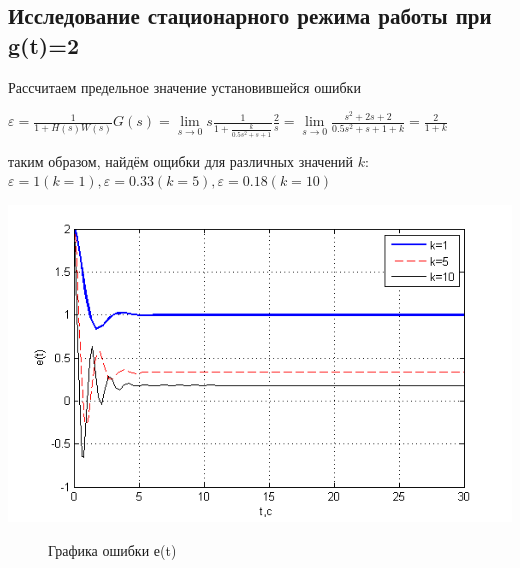 \documentclass[a4paper, 11pt]{article}
\begin{document}
\subsection{Исследование стационарного режима работы при g(t)=2}
Рассчитаем предельное значение установившейся ошибки
\vspace{0.5cm}

$\varepsilon  = \frac{1}{{1 + H\left( s \right)W\left( s \right)}}G\left( s \right) = \mathop {\lim }\limits_{s \to 0} s\frac{1}{{1 + \frac{k}{{0.5{s^2} + s + 1}}}}\frac{2}{s} = \mathop {\lim }\limits_{s \to 0} \frac{{{s^2} + 2s + 2}}{{0.5{s^2} + s + 1 + k}} = \frac{2}{{1 + k}}$
\vspace{0.5cm}

таким образом, найдём ощибки для различных значений $k$:
$\varepsilon=1 (k=1), \varepsilon=0.33 (k=5), \varepsilon=0.18 (k=10)$

\begin{center}
	\includegraphics[width=0.7\linewidth]{1}
	\begin{figure}[ht]
	
	\caption{Графика ошибки е(t)}
	\label{fig:1}
	\end{figure}
\end{center}
\end{document}
